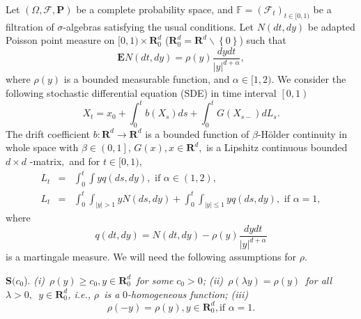 \documentclass[11pt]{amsart}
\theoremstyle{plain}
\numberwithin{equation}{section}
\begin{document}
Let $\left( \varOmega,\mathcal{F},\mathbf{P}\right) $ be a complete
probability space, and $\mathbb{F}=\left( \mathcal{F}_{t}\right) _{t\in
\lbrack 0,1)}$ be a filtration of $\sigma $-algebras satisfying the usual
conditions. Let $N\left( dt,dy\right) $ be adapted Poisson point measure on $[0,1)\times \mathbf{R}_{0}^{d}$ ($\mathbf{R}_{0}^{d}=\mathbf{R}^{d}\backslash \left\{ 0\right\} $) such that\begin{equation*}
\mathbf{E}N\left( dt,dy\right) =\rho \left( y\right) \frac{dydt}{\left\vert
y\right\vert ^{d+\alpha }},
\end{equation*}where $\rho \left( y\right) $ is a bounded measurable function, and $\alpha
\in \lbrack 1,2)$. We consider the following stochastic differential
equation (SDE) in time interval $\left[ 0,1\right) $\begin{equation}
X_{t}=x_{0}+\int_{0}^{t}b\left( X_{s}\right) ds+\int_{0}^{t}G\left(
X_{s-}\right) dL_{s}.  \label{m1}
\end{equation}The drift coefficient $b:\mathbf{R}^{d}\longrightarrow \mathbf{R}^{d}$ is a
bounded function of $\beta $-H\"{o}lder continuity in whole space with $\beta \in \left( 0,1\right] $, $G\left( x\right) ,x\in \mathbf{R}^{d},$ is a
Lipshitz continuous bounded $d\times d$ -matrix$,$ and for $t\in \lbrack
0,1),$ 
\begin{eqnarray*}
L_{t} &=&\int_{0}^{t}\int yq\left( ds,dy\right) ,\text{ if }\alpha \in
\left( 1,2\right) , \\
L_{t} &=&\int_{0}^{t}\int_{\left\vert y\right\vert >1}yN\left( ds,dy\right)
+\int_{0}^{t}\int_{\left\vert y\right\vert \leq 1}yq(ds,dy),\text{ if }\alpha =1,
\end{eqnarray*}where 
\begin{equation*}
q\left( dt,dy\right) =N\left( dt,dy\right) -\rho \left( y\right) \frac{dydt}{\left\vert y\right\vert ^{d+\alpha }}
\end{equation*}is a martingale measure. We will need the following assumptions for $\rho $.

\textbf{S}$(c_{0}$). \emph{(i)~}$\rho \left( y\right) \geq c_{0},y\in 
\mathbf{R}_{0}^{d}$\emph{\ for some }$c_{0}>0$\emph{;\newline
(ii)\thinspace ~}$\rho \left( \lambda y\right) =\rho \left( y\right) $\emph{\ for all }$\lambda >0,$\emph{\ }$y\in \mathbf{R}_{0}^{d}$\emph{, i.e., }$\rho $\emph{\ is a }$0$\emph{-homogeneous function;\newline
(iii) } 
\begin{equation}
\rho \left( -y\right) =\rho \left( y\right) ,y\in \mathbf{R}_{0}^{d},\text{
if }\alpha =1.  \label{sym}
\end{equation}
\end{document}
